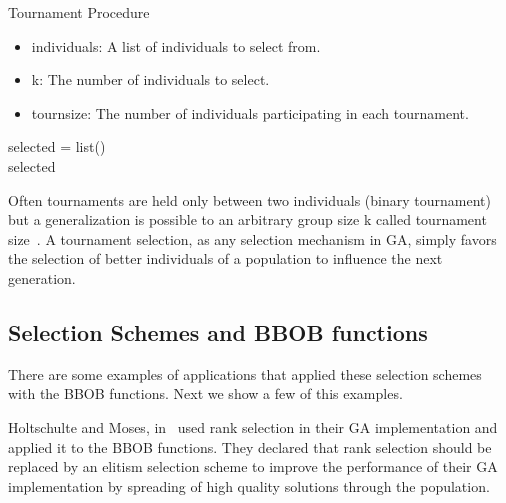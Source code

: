 \begin{algorithm}
	\caption{Tournament Procedure}
	\label{tournament_procedure}
	\tiny	\begin{itemize}
		\item individuals: A list of individuals to select from.\vspace{-3mm}
		\item k: The number of individuals to select.\vspace{-3mm}
		\item tournsize: The number of individuals participating in each tournament.\vspace{-3mm}
	\end{itemize}
	
	\normalsize
	
	\BlankLine
		
	selected = list()\\
	\return selected
\end{algorithm}



Often tournaments are held only between two individuals (binary tournament) but a generalization is possible to an arbitrary group size k called tournament size~\cite{blickle1995mathematical, goldberg1991comparative}. A tournament selection, as any selection mechanism in GA, simply favors the selection of better individuals of a population to influence the next generation. 


\subsection{Selection Schemes and BBOB functions}

There are some examples of applications that applied these selection schemes with the BBOB functions. Next we show a few of this examples.

Holtschulte and Moses, in~\cite{holtschulte2013benchmarking} used rank selection in their GA implementation and applied it to the BBOB functions. They declared that rank selection should be replaced by an elitism selection scheme to improve the performance of their GA implementation by spreading of high quality solutions through the population. 


